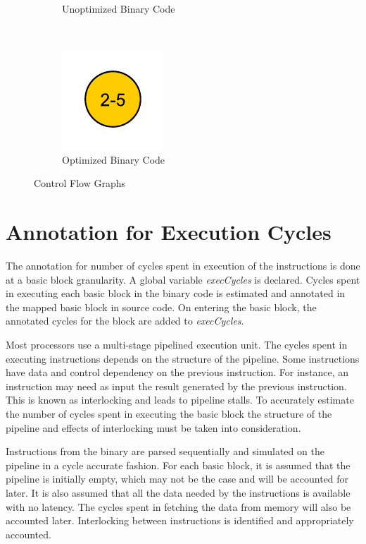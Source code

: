 \begin{figure}[h!]
\begin{subfigure}[t]{.33\textwidth}
\caption{Unoptimized Binary Code}
\label{fig:cfgUnopt}
\end{subfigure}%
~
\begin{subfigure}[t]{.33\textwidth}
\centering
\captionsetup{margin=10pt}
\includegraphics[width=.5\textwidth]{figures/CondExecObjOptFlowChart.pdf}
\caption{Optimized Binary Code}
\label{fig:cfgOpt}
\end{subfigure}
\caption{Control Flow Graphs}
\end{figure}

\section{Annotation for Execution Cycles}
The annotation for number of cycles spent in execution of the instructions is done at a basic block granularity. A global variable \emph{execCycles} is declared. Cycles spent in executing each basic block in the binary code is estimated and annotated in the mapped basic block in source code. On entering the basic block, the annotated cycles for the block are added to \emph{execCycles}.

Most processors use a multi-stage pipelined execution unit. The cycles spent in executing instructions depends on the structure of the pipeline. Some instructions have data and control dependency on the previous instruction. For instance, an instruction may need as input the result generated by the previous instruction. This is known as interlocking and leads to pipeline stalls. To accurately estimate the number of cycles spent in executing the basic block the structure of the pipeline and effects of interlocking must be taken into consideration.

Instructions from the binary are parsed sequentially and simulated on the pipeline in a cycle accurate fashion. For each basic block, it is assumed that the pipeline is initially empty, which may not be the case and will be accounted for later. It is also assumed that all the data needed by the instructions is available with no latency. The cycles spent in fetching the data from memory will also be accounted later. Interlocking between instructions is identified and appropriately accounted. 

